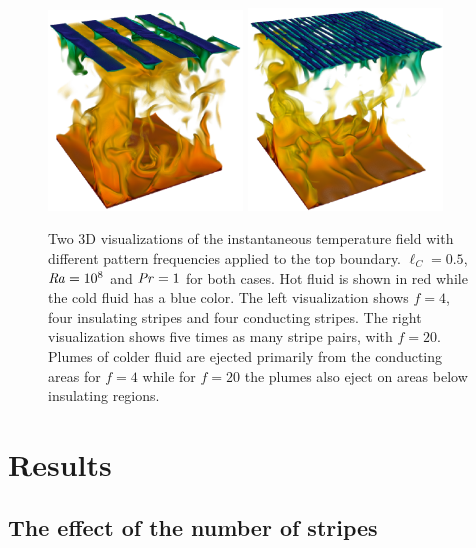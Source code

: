 \documentclass{jfm}
\newcommand\Pran{\mbox{\textit{Pr}}} %
\newcommand\Ray{\mbox{\textit{Ra}}}  %
\begin{document}
\begin{figure}
\centering
\includegraphics[width=0.46\textwidth]{fig2a.eps}
\qquad
\includegraphics[width=0.46\textwidth]{fig2b.eps}
\caption{%
Two 3D visualizations of the instantaneous temperature field with
different pattern frequencies applied to the top boundary.  $\ell_C=0.5$,
$\Ray=10^8$ and $\Pran=1$ for both cases.  Hot fluid is shown in red while
the cold fluid has a blue color.  The left visualization shows $f=4$, four
insulating stripes and four conducting stripes. The right visualization
shows five times as many stripe pairs, with $f=20$.  Plumes of colder
fluid are ejected primarily from the conducting areas for $f=4$ while for
$f=20$ the plumes also eject on areas below insulating regions.  }
\label{figure2}
\end{figure}%

\section{Results}\label{VariationPattern}%

\subsection{The effect of the number of stripes}\label{NumberofStripes}%
\end{document}
